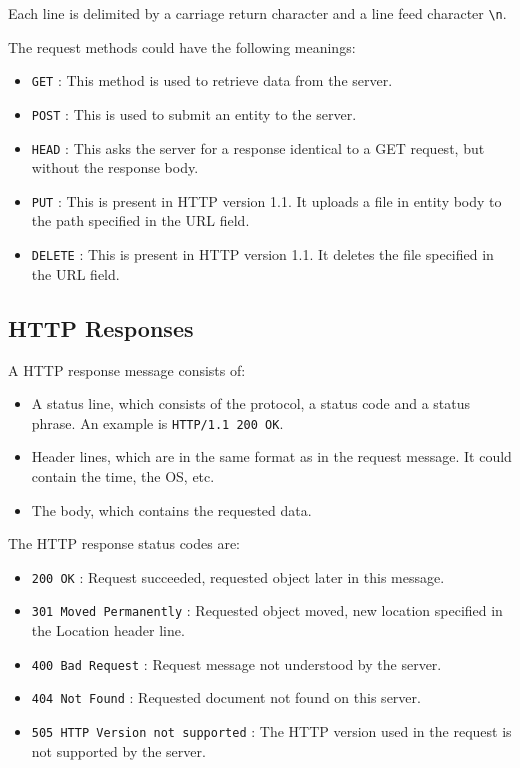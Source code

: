 \documentclass[12pt,letterpaper]{amsbook}
\theoremstyle{definition}
\begin{document}
Each line is delimited by a carriage return character  and a line feed character \texttt{\textbackslash n}.

The request methods could have the following meanings:

\begin{itemize}
  \item \texttt{GET} : This method is used to retrieve data from the server.
  \item \texttt{POST} : This is used to submit an entity to the server.
  \item \texttt{HEAD} : This asks the server for a response identical to a GET request, but without the response body.
  \item \texttt{PUT} : This is present in HTTP version 1.1. It uploads a file in entity body to the path specified in the URL field.
  \item \texttt{DELETE} : This is present in HTTP version 1.1. It deletes the file specified in the URL field.
\end{itemize}

\subsection{HTTP Responses}

A HTTP response message consists of:

\begin{itemize}
  \item A status line, which consists of the protocol, a status code and a status phrase. An example is \texttt{HTTP/1.1 200 OK}.
  \item Header lines, which are in the same format as in the request message. It could contain the time, the OS, etc.
  \item The body, which contains the requested data.
\end{itemize}

The HTTP response status codes are:

\begin{itemize}
  \item \texttt{200 OK} : Request succeeded, requested object later in this message.
  \item \texttt{301 Moved Permanently} : Requested object moved, new location specified in the Location header line.
  \item \texttt{400 Bad Request} : Request message not understood by the server.
  \item \texttt{404 Not Found} : Requested document not found on this server.
  \item \texttt{505 HTTP Version not supported} : The HTTP version used in the request is not supported by the server.
\end{itemize}
\end{document}
